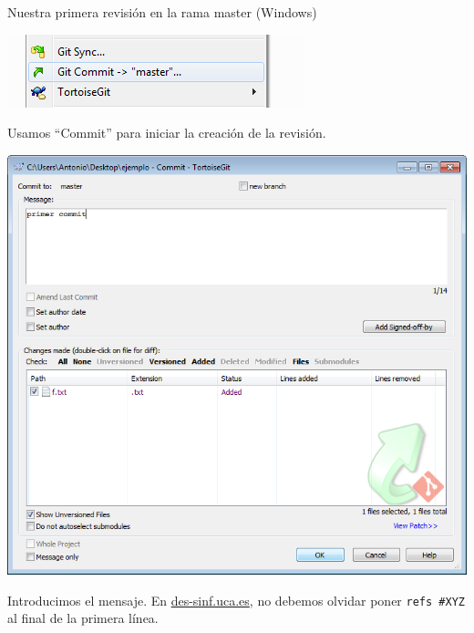 \documentclass[xcolor=svgnames]{beamer}
\begin{document}
\begin{frame}[t]{Nuestra primera revisión en la rama master (Windows)}
\begin{overprint}
\begin{center}
      \includegraphics[width=\textwidth,height=.6\textheight,keepaspectratio]{tomas/primercommit-03-commit}

      \vspace{.15\textheight}

      Usamos ``Commit'' para iniciar la creación de la revisión.
    \end{center}

    \begin{center}
      \includegraphics[width=\textwidth,height=.6\textheight,keepaspectratio]{tomas/primercommit-04-dlgcommit}

      \vfill

      Introducimos el mensaje. En \url{des-sinf.uca.es}, no debemos olvidar poner \texttt{refs \#{}XYZ} al final de la primera línea.
    \end{center}


\end{overprint}
\end{frame}
\end{document}
